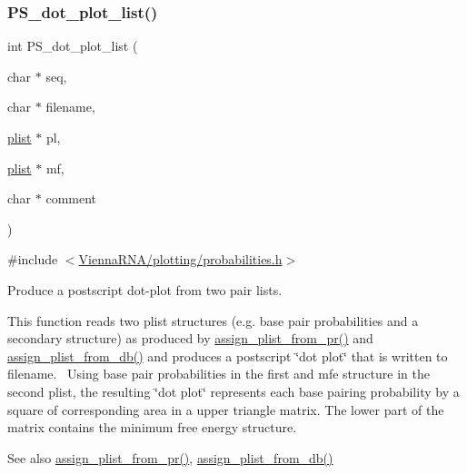 \subsubsection{\texorpdfstring{P\+S\+\_\+dot\+\_\+plot\+\_\+list()}{PS\_dot\_plot\_list()}}
{\footnotesize\ttfamily int P\+S\+\_\+dot\+\_\+plot\+\_\+list (\begin{DoxyParamCaption}\item[{char $\ast$}]{seq,  }\item[{char $\ast$}]{filename,  }\item[{\hyperlink{group__data__structures_ga9608eed021ebfbdd7a901cfdc446c8e9}{plist} $\ast$}]{pl,  }\item[{\hyperlink{group__data__structures_ga9608eed021ebfbdd7a901cfdc446c8e9}{plist} $\ast$}]{mf,  }\item[{char $\ast$}]{comment }\end{DoxyParamCaption})}



{\ttfamily \#include $<$\hyperlink{probabilities_8h}{Vienna\+R\+N\+A/plotting/probabilities.\+h}$>$}



Produce a postscript dot-\/plot from two pair lists. 

This function reads two plist structures (e.\+g. base pair probabilities and a secondary structure) as produced by \hyperlink{group__part__func__global__deprecated_ga1cc05aaa9b0e7df2d3887e98321c2030}{assign\+\_\+plist\+\_\+from\+\_\+pr()} and \hyperlink{group__part__func__global__deprecated_gab61df77cf7949cd516181fce0c3d7d78}{assign\+\_\+plist\+\_\+from\+\_\+db()} and produces a postscript \char`\"{}dot plot\char`\"{} that is written to \textquotesingle{}filename\textquotesingle{}.~\newline
Using base pair probabilities in the first and mfe structure in the second plist, the resulting \char`\"{}dot plot\char`\"{} represents each base pairing probability by a square of corresponding area in a upper triangle matrix. The lower part of the matrix contains the minimum free energy structure.

\begin{DoxySeeAlso}{See also}
\hyperlink{group__part__func__global__deprecated_ga1cc05aaa9b0e7df2d3887e98321c2030}{assign\+\_\+plist\+\_\+from\+\_\+pr()}, \hyperlink{group__part__func__global__deprecated_gab61df77cf7949cd516181fce0c3d7d78}{assign\+\_\+plist\+\_\+from\+\_\+db()}
\end{DoxySeeAlso}

